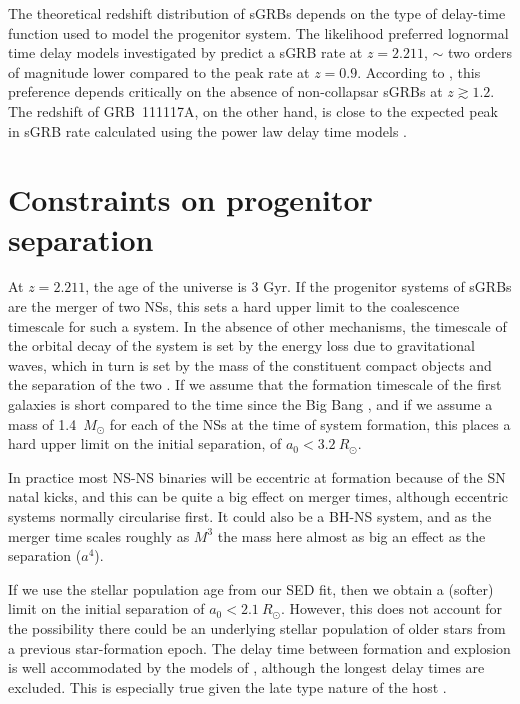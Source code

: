 \documentclass{aa}    %
\begin{document}
The theoretical redshift distribution of sGRBs depends on the type of delay-time
function used to model the progenitor system. The likelihood preferred lognormal
time delay models investigated by \citet{Wanderman2015} predict a sGRB rate at
$z = 2.211$, $\sim$ two orders of magnitude lower compared to the peak rate at
$z = 0.9$. According to \citet{Wanderman2015}, this preference depends
critically on the absence of non-collapsar sGRBs at $z \gtrsim 1.2$. The
redshift of GRB~111117A, on the other hand, is close to the expected peak in
sGRB rate calculated using the power law delay time models \citep{Behroozi2014,
	Wanderman2015}.


\section{Constraints on progenitor separation}

At $z = 2.211$, the age of the universe is 3 Gyr. If the progenitor systems of
sGRBs are the merger of two NSs, this sets a hard upper limit to the coalescence
timescale for such a system. In the absence of other mechanisms, the timescale
of the orbital decay of the system is set by the energy loss due to
gravitational waves, which in turn is set by the mass of the constituent compact
objects and the separation of the two \citep{Postnov2014}. If we assume that the
formation timescale of the first galaxies is short compared to the time since
the Big Bang \citep{Richard2011}, and if we assume a mass of 1.4~$M_\odot$ for
each of the NSs at the time of system formation, this places a hard upper limit
on the initial separation, of $a_0 < 3.2~R_\odot$.

In practice most NS-NS binaries will be eccentric at formation because of the SN
natal kicks, and this can be quite a big effect on merger times, although
eccentric systems normally circularise first. It could also be a BH-NS system,
and as the merger time scales roughly as $M^3$ the mass here almost as big an
effect as the separation ($a^4$).

If we use the stellar population age from our SED fit, then we obtain a
(softer) limit on the initial separation of $a_0 < 2.1~R_\odot$. However, this
does not account for the possibility there could be an underlying stellar
population of older stars from a previous star-formation epoch. The delay time
between formation and explosion is well accommodated by the models of
\citet{Belczynski2006}, although the longest delay times are excluded.
This is especially true given the late type nature of the host
\citep{OShaughnessy2008}.
\end{document}
